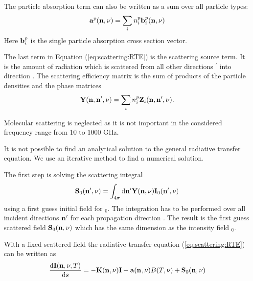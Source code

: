 The particle absorption term can also be written as a sum over all
particle types:
\begin{eqnarray}
  {\bf a}^{p}({\bf n}, \nu) = \sum_i n^p_i {\bf b}^{p}_i ({\bf n}, \nu)
\end{eqnarray}
Here ${\bf b}^{p}_i$ is the single particle absorption cross section
vector. 

The last term in Equation (\ref{eq:scattering:RTE}) is the scattering source
term. It is the 
amount of radiation which is scattered from all other directions \PDir$^\prime$   
into direction \PDir.  The scattering efficiency matrix
\SEfMat is the sum of products  
of the particle densities \PDen  and the phase matrices \PhaMat
\begin{eqnarray}
{\bf Y}({\bf n}, {\bf n}', \nu) = \sum_i{n^p_i{\bf Z}_i({\bf n}, {\bf n}', \nu)}.
\end{eqnarray}

Molecular scattering is neglected as it is not important in the 
considered frequency range from 10 to 1000 GHz. 


\label{sec:scattering:solution_rte}

It is not possible to find an analytical solution to the general
radiative transfer equation. We use an iterative method to find a
numerical solution.

\label{sec:scattering:scat_int}

The first step is solving the scattering integral
\begin{eqnarray}
  {\bf S}_0 ({\bf n}^\prime, \nu)  = \int_{4\pi} \mathrm{d} {\bf n}^\prime {\bf Y}({\bf n}, \nu) {\bf I}_0({\bf n}^\prime, \nu) 
\end{eqnarray}
using a first guess initial field for \StoVec$_0$\DirFrePr . The integration
has to be performed over all incident directions ${\bf n}^\prime$ for each
propagation direction \PDir{}. The result is the first guess scattered field ${\bf S}_0({\bf n}, \nu)$
which has the same dimension as the intensity field \StoVec$_0$\DirFrePr. 

\label{sec:scattering:RTE}
With a fixed scattered field \ScaInt\DirFre{} the radiative transfer
equation (\ref{eq:scattering:RTE}) can be written as
\begin{eqnarray}
     \frac{\mathrm{d} {\bf I}({\bf n}, \nu, T)}{\mathrm{d} s} =
     -{\bf K}({\bf n}, \nu){\bf I} + {\bf a}({\bf n}, \nu) B(T, \nu)
     +{\bf S}_0({\bf n}, \nu)
\label{eq:rad_fs_sol}
\end{eqnarray} 

